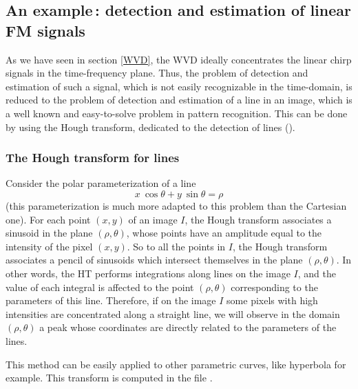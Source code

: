 \subsection{An example\,: detection and estimation of linear FM signals}
  As we have seen in section \ref{WVD}, the WVD ideally concentrates the
linear chirp signals in the time-frequency plane. Thus, the problem of
detection and estimation of such a signal, which is not easily recognizable
in the time-domain, is reduced to the problem of detection and estimation
of a line in an image, which is a well known and easy-to-solve problem in
pattern recognition. This can be done by using the Hough transform,
dedicated to the detection of lines (\cite{BAR95}).

\subsubsection{The Hough transform for lines}
Consider the polar parameterization of a line 
\[x\ \cos\theta+y\ \sin\theta=\rho\] 
(this parameterization is much more adapted to this problem than the
Cartesian one). For each point $(x,y)$ of an image $I$, the Hough transform
associates a sinusoid in the plane $(\rho,\theta)$, whose points have an
amplitude equal to the intensity of the pixel $(x,y)$. So to all the points
in $I$, the Hough transform associates a pencil of sinusoids which
intersect themselves in the plane $(\rho,\theta)$. In other words, the HT
performs integrations along lines on the image $I$, and the value of each
integral is affected to the point $(\rho,\theta)$ corresponding to the
parameters of this line. Therefore, if on the image $I$ some pixels with
high intensities are concentrated along a straight line, we will observe in
the domain $(\rho,\theta)$ a peak whose coordinates are directly related to
the parameters of the lines.

  This method can be easily applied to other parametric curves, like
hyperbola for example. This transform is computed in the file
.

